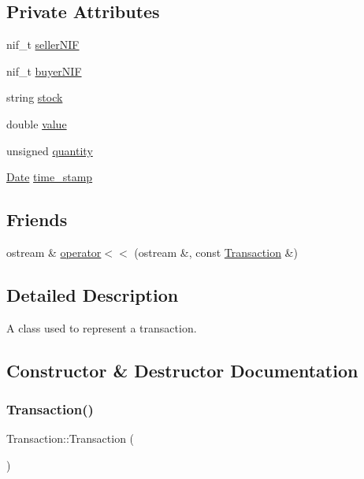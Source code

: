 \subsection*{Private Attributes}
\begin{DoxyCompactItemize}
\item 
nif\+\_\+t \hyperlink{class_transaction_a4f779b188a508987aa610e4274765059}{seller\+N\+IF}
\item 
nif\+\_\+t \hyperlink{class_transaction_a3db24320f561ae3a72887e7a34b19917}{buyer\+N\+IF}
\item 
string \hyperlink{class_transaction_ae0fd78bf4db4a8dc6d4d931f107a6213}{stock}
\item 
double \hyperlink{class_transaction_a75d644553218251b030313776ff33f51}{value}
\item 
unsigned \hyperlink{class_transaction_a32045bcdce9ba390cf1c646578e29fd3}{quantity}
\item 
\hyperlink{class_date}{Date} \hyperlink{class_transaction_a94ff0c865db09881fa3becfdad25ce5d}{time\+\_\+stamp}
\end{DoxyCompactItemize}
\subsection*{Friends}
\begin{DoxyCompactItemize}
\item 
ostream \& \hyperlink{class_transaction_a8d6d6be74010b57302f4567e06cdbed3}{operator$<$$<$} (ostream \&, const \hyperlink{class_transaction}{Transaction} \&)
\end{DoxyCompactItemize}


\subsection{Detailed Description}
A class used to represent a transaction. 

\subsection{Constructor \& Destructor Documentation}
\mbox{\label{class_transaction_a0c8031bed6e7a45eda7bc2ca8f40e851}} 
\subsubsection{\texorpdfstring{Transaction()}{Transaction()}\hspace{0.1cm}{\footnotesize\ttfamily [1/3]}}
{\footnotesize\ttfamily Transaction\+::\+Transaction (\begin{DoxyParamCaption}{ }\end{DoxyParamCaption})\hspace{0.3cm}{\ttfamily [default]}}

